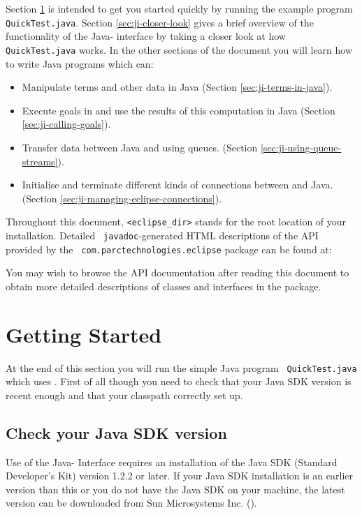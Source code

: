 Section \ref{sec:ji-getting-started} is intended to get you started
quickly by running the example program {\tt QuickTest.java}. Section
\ref{sec:ji-closer-look} gives a brief overview of the functionality
of the Java-{\eclipse} interface by taking a closer look at how {\tt
QuickTest.java} works. In the other sections of the document you will
learn how to write Java programs which can:
\begin{itemize}

\item Manipulate {\eclipse} terms and other data in Java (Section
\ref{sec:ji-terms-in-java}).
\item Execute goals in {\eclipse} and use the results of this
computation in Java (Section \ref{sec:ji-calling-goals}).
\item Transfer data between Java and {\eclipse} using queues.
(Section \ref{sec:ji-using-queue-streams}).
\item Initialise and terminate different kinds of connections between {\eclipse} and Java. (Section \ref{sec:ji-managing-eclipse-connections}).
\end{itemize}

Throughout this document, {\tt <eclipse\_dir>} stands for the root
location of your {\eclipse} installation. Detailed {\tt
javadoc}-generated HTML descriptions of the API provided by the {\tt
com.parctechnologies.eclipse} package can be found at:
\begin{quote}
\end{quote}
You may wish to browse the API documentation after reading this
document to obtain more detailed descriptions of classes and
interfaces in the package.

\section{Getting Started}
\label{sec:ji-getting-started}
At the end of this section you will run the simple Java program {\tt
QuickTest.java} which uses {\eclipse}. First of all though
you need to check that your Java SDK version is recent enough and that
your classpath correctly set up.
\subsection{Check your Java SDK version}
Use of the Java-{\eclipse} Interface requires an installation of the
Java SDK (Standard Developer's Kit) version 1.2.2 or later. If your
Java SDK installation is an earlier version than this or you do not
have the Java SDK on your machine, the latest version can be
downloaded from Sun Microsystems Inc. ().

